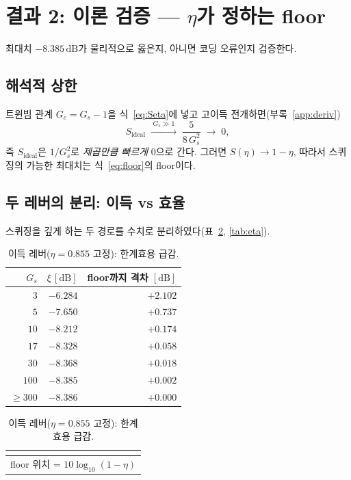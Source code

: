 \documentclass[11pt,a4paper]{article}
\newcommand{\dB}{\,\mathrm{dB}}
\begin{document}
\section{결과 2: 이론 검증 --- $\eta$가 정하는 floor}
최대치 $-8.385\dB$가 물리적으로 옳은지, 아니면 코딩 오류인지 검증한다.

\subsection{해석적 상한}
트윈빔 관계 $G_c=G_s-1$을 식~\eqref{eq:Seta}에 넣고 고이득 전개하면(부록~\ref{app:deriv})
\begin{equation}
S_{\mathrm{ideal}}\;\xrightarrow{\;G_s\gg1\;}\;\frac{5}{8\,G_s^{2}}\;\to\;0 ,
\label{eq:asym}
\end{equation}
즉 $S_{\mathrm{ideal}}$은 $1/G_s^2$로 \emph{제곱만큼 빠르게} 0으로 간다. 그러면
$S(\eta)\to 1-\eta$, 따라서 스퀴징의 가능한 최대치는 식~\eqref{eq:floor}의 floor이다.

\subsection{두 레버의 분리: 이득 vs 효율}
스퀴징을 깊게 하는 두 경로를 수치로 분리하였다(표~\ref{tab:gain}, \ref{tab:eta}).

\begin{table}[h]
\centering
\caption{이득 레버($\eta=0.855$ 고정): 한계효용 급감.}
\label{tab:gain}
\begin{tabular}{rrr}
\toprule
$G_s$ & $\xi\,[\mathrm{dB}]$ & floor까지 격차 $[\mathrm{dB}]$\\
\midrule
$3$    & $-6.284$ & $+2.102$\\
$5$    & $-7.650$ & $+0.737$\\
$10$   & $-8.212$ & $+0.174$\\
$17$   & $-8.328$ & $+0.058$\\
$30$   & $-8.368$ & $+0.018$\\
$100$  & $-8.385$ & $+0.002$\\
$\ge 300$ & $-8.386$ & $+0.000$\\
\bottomrule
\end{tabular}
\quad
\begin{tabular}{rr}
\multicolumn{2}{c}{}\\
\toprule
\multicolumn{2}{c}{floor 위치 = $10\log_{10}(1-\eta)$}\\
\bottomrule
\end{tabular}
\end{table}
\end{document}
